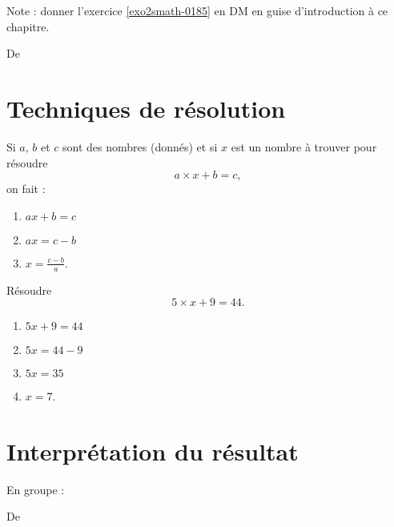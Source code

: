 
Note : donner l'exercice \ref{exo2smath-0185} en DM en guise d'introduction à ce chapitre.


De \cite{NRHooXFvgpp4}

\section{Techniques de résolution}

Si \( a\), \( b\) et \( c\) sont des nombres (donnés) et si \( x\) est un nombre à trouver pour résoudre
\begin{equation}
    a\times x+b=c,
\end{equation}
on fait :
\begin{enumerate}
    \item
        $ax+b=c$
    \item
        $ax=c-b$
    \item
        $x=\frac{ c-b }{ a }$.
\end{enumerate}

\begin{example}
    Résoudre
    \begin{equation}
        5\times x+9=44.
    \end{equation}
    \begin{enumerate}
        \item
            \( 5x+9=44\)
        \item
            \( 5x=44-9\)
        \item
             \( 5x=35\)
         \item
             \( x=7\).
    \end{enumerate}
\end{example}

\section{Interprétation du résultat}

En groupe :

De \cite{NRHooXFvgpp4}



